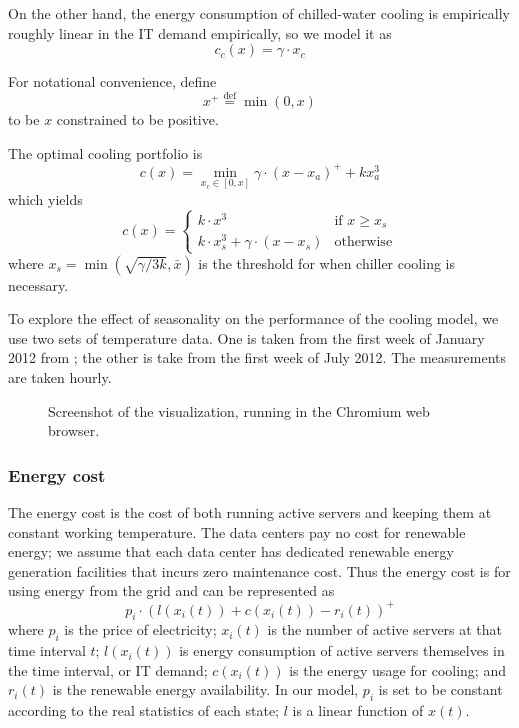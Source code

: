 \documentclass{acm_proc_article-sp}
\newcommand{\eqdef}{\ensuremath{\overset{\mathrm{def}}{=}}}
\begin{document}
On the other hand, the energy consumption of chilled-water cooling is
empirically roughly linear in the IT demand empirically, so we model
it as
\begin{equation}
c_c(x) = \gamma \cdot x_c
\end{equation}

For notational convenience, define
\begin{equation}
	x^+ \eqdef \min(0, x)
\end{equation}
to be $x$ constrained to be positive.

The optimal cooling portfolio is
\begin{equation}
c(x) = \min_{x_c \in [0,x]} \gamma \cdot (x-x_a)^+ + kx_a^3
\end{equation}
which yields
$$
c(x) = \left\{ \begin{array}{ll}
	k \cdot x^3 & \mbox{if $x \geq x_s$}\\
	k \cdot x_s^3 + \gamma \cdot (x-x_s) & \mbox{otherwise}\end{array} \right.
$$
where $x_s = \min \left(\sqrt{\gamma/3k}, \bar{x}\right)$ is the threshold for when chiller cooling is necessary.

To explore the effect of seasonality on the performance of the cooling model, we use two sets of temperature data. One is taken from the first week of January 2012 from \cite{temp}; the other is take from the first week of July 2012. The measurements are taken hourly.

\begin{figure*}
\centering
{}
\caption{Screenshot of the visualization, running in the Chromium web browser.}
\end{figure*}
\subsubsection{Energy cost}
The energy cost is the cost of both running active servers and keeping them at constant working temperature. The data centers pay no cost for renewable energy; we assume that each data center has dedicated renewable energy generation facilities that incurs zero maintenance cost. Thus the energy cost is for using energy from the grid and can be represented as
\begin{equation}
p_i \cdot (l(x_i(t)) + c(x_i(t)) - r_i(t))^+
\end{equation}
where $p_i$ is the price of electricity; $x_i(t)$ is the number of active servers at that time interval $t$; $l(x_i(t))$ is energy consumption of active servers themselves in the time interval, or IT demand; $c(x_i(t))$ is the energy usage for cooling; and $r_i(t)$ is the renewable energy availability. In our model, $p_i$ is set to be constant according to the real statistics of each state; $l$ is a linear function of $x(t)$.
\end{document}
